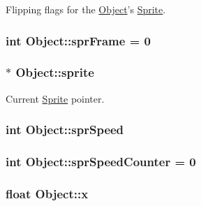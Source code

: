 Flipping flags for the \hyperlink{class_object}{Object}'s \hyperlink{class_sprite}{Sprite}. 

\hypertarget{class_object_ad61c7c0c72c28dd4abbc5f14cfdf3f18}{
\subsubsection[{spr\-Frame}]{\setlength{\rightskip}{0pt plus 5cm}int Object\-::spr\-Frame = 0\hspace{0.3cm}{\ttfamily [protected]}}}\label{class_object_ad61c7c0c72c28dd4abbc5f14cfdf3f18}
\hypertarget{class_object_ad936466f3f6b6e8fa401842c573b44e6}{
\subsubsection[{sprite}]{$\ast$ Object\-::sprite}}\label{class_object_ad936466f3f6b6e8fa401842c573b44e6}


Current \hyperlink{class_sprite}{Sprite} pointer. 

\hypertarget{class_object_ab66e9611429a7f5a0f0889332514e607}{
\subsubsection[{spr\-Speed}]{\setlength{\rightskip}{0pt plus 5cm}int Object\-::spr\-Speed\hspace{0.3cm}{\ttfamily [protected]}}}\label{class_object_ab66e9611429a7f5a0f0889332514e607}
\hypertarget{class_object_aa16902b53e4e950380464c71f0b9554b}{
\subsubsection[{spr\-Speed\-Counter}]{\setlength{\rightskip}{0pt plus 5cm}int Object\-::spr\-Speed\-Counter = 0\hspace{0.3cm}{\ttfamily [protected]}}}\label{class_object_aa16902b53e4e950380464c71f0b9554b}
\hypertarget{class_object_a99addca3b5d96c214fa8f90474224699}{
\subsubsection[{x}]{\setlength{\rightskip}{0pt plus 5cm}float Object\-::x}}\label{class_object_a99addca3b5d96c214fa8f90474224699}


